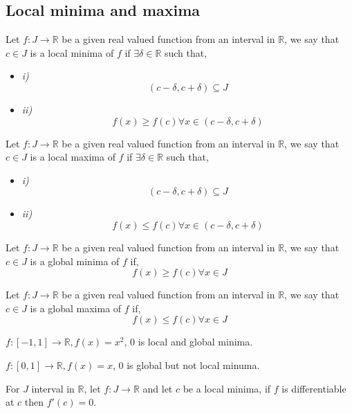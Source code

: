 \documentclass[11pt,a4paper]{colorart}
\def\d{{\delta}}
\def\R{\mathbb{R}}
\def\ra{\rightarrow}
\begin{document}
\subsection{Local minima and maxima}

\begin{definition}
	Let $f:J\ra\R$ be a given real valued function from an interval in $\R$, we say that $c\in J$ is a local minima of $f$ if $\exists \d \in \R$ such that,
	\begin{itemize}
		\item \textit{i)} \[ (c-\d,c+\d) \subseteq J \]
		\item \textit{ii)} \[ f(x) \geq f(c) \forall x \in (c-\d,c+\d) \]
	\end{itemize}
\end{definition}

\begin{definition}
	Let $f:J\ra\R$ be a given real valued function from an interval in $\R$, we say that $c\in J$ is a local maxima of $f$ if $\exists \d \in \R$ such that,
	\begin{itemize}
		\item \textit{i)} \[ (c-\d,c+\d) \subseteq J \]
		\item \textit{ii)} \[ f(x) \leq f(c) \forall x \in (c-\d,c+\d) \]
	\end{itemize}
\end{definition}

\begin{definition}
	Let $f:J\ra\R$ be a given real valued function from an interval in $\R$, we say that $c\in J$ is a global minima of $f$ if,
	\[ f(x) \geq f(c) \forall x \in J \]
\end{definition}

\begin{definition}
	Let $f:J\ra\R$ be a given real valued function from an interval in $\R$, we say that $c\in J$ is a global maxima of $f$ if,
	\[ f(x) \leq f(c) \forall x \in J \]
\end{definition}

\begin{example}
	$f:[-1,1]\ra\R, f(x) = x^2$, 0 is local and global minima.
\end{example}

\begin{example}
	$f:[0,1]\ra\R, f(x)=x$, 0 is global but not local minuma.
\end{example}

\begin{theorem}
	For $J$ interval in $\R$, let $f:J\ra\R$ and let $c$ be a local minima, if $f$ is differentiable at $c$ then $f'(c)=0$.
\end{theorem}
\end{document}
